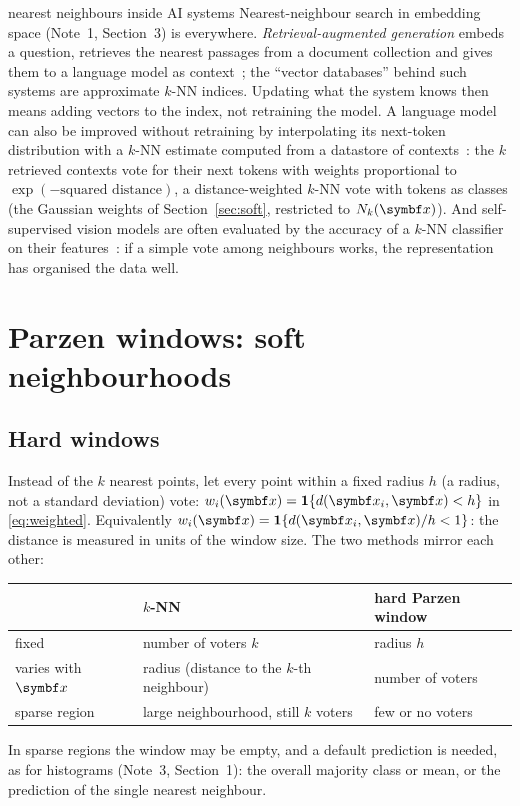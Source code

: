 \documentclass[11pt]{article}
\begin{document}
\begin{modern}{nearest neighbours inside AI systems}
Nearest-neighbour search in embedding space (Note~1, Section~3) is everywhere. \emph{Retrieval-augmented generation}
embeds a question, retrieves the nearest passages from a document collection and gives them to a language model as
context~\cite{lewis2020}; the ``vector databases'' behind such systems are approximate $k$-NN indices. Updating what
the system knows then means adding vectors to the index, not retraining the model. A language model can also be
improved without retraining by interpolating its next-token distribution with a $k$-NN estimate computed from a
datastore of contexts~\cite{khandelwal2020}: the $k$ retrieved contexts vote for their next tokens with weights
proportional to $\exp(-\text{squared distance})$, a distance-weighted $k$-NN vote with tokens as classes (the Gaussian
weights of Section~\ref{sec:soft}, restricted to $N_k(\x)$). And self-supervised vision models are often evaluated by
the accuracy of a $k$-NN classifier on their features~\cite{wu2018}: if a simple vote among neighbours works, the
representation has organised the data well.
\end{modern}

\section{Parzen windows: soft neighbourhoods}\label{sec:parzen}

\subsection{Hard windows}\label{sec:hard}

Instead of the $k$ nearest points, let every point within a fixed radius $h$ (a radius, not a standard deviation) vote: $w_i(\x) = \ind{d(\x_i, \x) < h}$
in \eqref{eq:weighted}. Equivalently $w_i(\x) = \ind{d(\x_i, \x)/h < 1}$: the distance is measured in units of the
window size. The two methods mirror each other:
\begin{center}\small
\begin{tabular}{@{}lll@{}}
\toprule
 & $k$-NN & hard Parzen window \\
\midrule
fixed & number of voters $k$ & radius $h$ \\
varies with $\x$ & radius (distance to the $k$-th neighbour) & number of voters \\
sparse region & large neighbourhood, still $k$ voters & few or no voters \\
\bottomrule
\end{tabular}
\end{center}
In sparse regions the window may be empty, and a default prediction is needed, as for histograms (Note~3,
Section~1): the overall majority class or mean, or the prediction of the single nearest neighbour.
\end{document}
